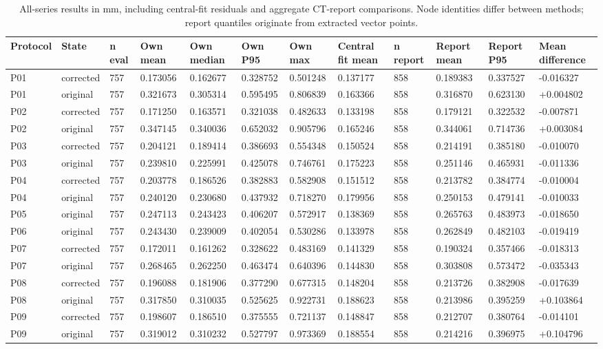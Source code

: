 \begin{table}
\caption{All-series results in mm, including central-fit residuals and aggregate CT-report comparisons. Node identities differ between methods; report quantiles originate from extracted vector points.}
\centering
\begin{tabular}{llllllllllll}
\hline
Protocol & State & n eval & Own mean & Own median & Own P95 & Own max & Central fit mean & n report & Report mean & Report P95 & Mean difference \\
\hline
P01 & corrected & 757 & 0.173056 & 0.162677 & 0.328752 & 0.501248 & 0.137177 & 858 & 0.189383 & 0.337527 & -0.016327 \\
P01 & original & 757 & 0.321673 & 0.305314 & 0.595495 & 0.806839 & 0.163366 & 858 & 0.316870 & 0.623130 & +0.004802 \\
P02 & corrected & 757 & 0.171250 & 0.163571 & 0.321038 & 0.482633 & 0.133198 & 858 & 0.179121 & 0.322532 & -0.007871 \\
P02 & original & 757 & 0.347145 & 0.340036 & 0.652032 & 0.905796 & 0.165246 & 858 & 0.344061 & 0.714736 & +0.003084 \\
P03 & corrected & 757 & 0.204121 & 0.189414 & 0.386693 & 0.554348 & 0.150524 & 858 & 0.214191 & 0.385180 & -0.010070 \\
P03 & original & 757 & 0.239810 & 0.225991 & 0.425078 & 0.746761 & 0.175223 & 858 & 0.251146 & 0.465931 & -0.011336 \\
P04 & corrected & 757 & 0.203778 & 0.186526 & 0.382883 & 0.582908 & 0.151512 & 858 & 0.213782 & 0.384774 & -0.010004 \\
P04 & original & 757 & 0.240120 & 0.230680 & 0.437932 & 0.718270 & 0.179956 & 858 & 0.250153 & 0.479141 & -0.010033 \\
P05 & original & 757 & 0.247113 & 0.243423 & 0.406207 & 0.572917 & 0.138369 & 858 & 0.265763 & 0.483973 & -0.018650 \\
P06 & original & 757 & 0.243430 & 0.239009 & 0.402054 & 0.530286 & 0.133978 & 858 & 0.262849 & 0.482103 & -0.019419 \\
P07 & corrected & 757 & 0.172011 & 0.161262 & 0.328622 & 0.483169 & 0.141329 & 858 & 0.190324 & 0.357466 & -0.018313 \\
P07 & original & 757 & 0.268465 & 0.262250 & 0.463474 & 0.640396 & 0.144830 & 858 & 0.303808 & 0.573472 & -0.035343 \\
P08 & corrected & 757 & 0.196088 & 0.181906 & 0.377290 & 0.677315 & 0.148204 & 858 & 0.213726 & 0.382908 & -0.017639 \\
P08 & original & 757 & 0.317850 & 0.310035 & 0.525625 & 0.922731 & 0.188623 & 858 & 0.213986 & 0.395259 & +0.103864 \\
P09 & corrected & 757 & 0.198607 & 0.186510 & 0.375555 & 0.721137 & 0.148847 & 858 & 0.212707 & 0.380764 & -0.014101 \\
P09 & original & 757 & 0.319012 & 0.310232 & 0.527797 & 0.973369 & 0.188554 & 858 & 0.214216 & 0.396975 & +0.104796 \\
\hline
\end{tabular}
\end{table}

